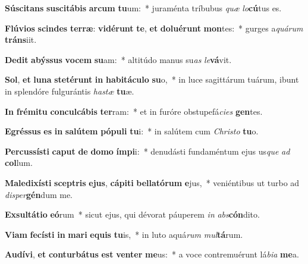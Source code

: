 \item \textbf{Sú}\textbf{sci}\textbf{tans} \textbf{su}\textbf{sci}\textbf{tá}\textbf{bis} \textbf{ar}\textbf{cum} \textbf{tu}um:~* juraménta tríbubus \textit{quæ} \textit{lo}\textbf{cú}tus es.
\item \textbf{Flú}\textbf{vi}\textbf{os} \textbf{scin}\textbf{des} \textbf{ter}\textbf{ræ}: \textbf{vi}\textbf{dé}\textbf{runt} \textbf{te}, \textbf{et} \textbf{do}\textbf{lu}\textbf{é}\textbf{runt} \textbf{mon}tes:~* gurges a\textit{quá}\textit{rum} \textbf{tráns}iit.
\item \textbf{De}\textbf{dit} \textbf{a}\textbf{býs}\textbf{sus} \textbf{vo}\textbf{cem} \textbf{su}am:~* altitúdo manus su\textit{as} \textit{le}\textbf{vá}vit.
\item \textbf{Sol}, \textbf{et} \textbf{lu}\textbf{na} \textbf{ste}\textbf{té}\textbf{runt} \textbf{in} \textbf{ha}\textbf{bi}\textbf{tá}\textbf{cu}\textbf{lo} \textbf{su}o,~* in luce sagittárum tuárum, ibunt in splendóre fulgurántis \textit{has}\textit{tæ} \textbf{tu}æ.
\item \textbf{In} \textbf{fré}\textbf{mi}\textbf{tu} \textbf{con}\textbf{cul}\textbf{cá}\textbf{bis} \textbf{ter}ram:~* et in furóre obstupefá\textit{ci}\textit{es} \textbf{gen}tes.
\item \textbf{E}\textbf{grés}\textbf{sus} \textbf{es} \textbf{in} \textbf{sa}\textbf{lú}\textbf{tem} \textbf{pó}\textbf{pu}\textbf{li} \textbf{tu}i:~* in salútem cum \textit{Chris}\textit{to} \textbf{tu}o.
\item \textbf{Per}\textbf{cus}\textbf{sís}\textbf{ti} \textbf{ca}\textbf{put} \textbf{de} \textbf{do}\textbf{mo} \textbf{ím}\textbf{pi}i:~* denudásti fundaméntum ejus us\textit{que} \textit{ad} \textbf{col}lum.
\item \textbf{Ma}\textbf{le}\textbf{di}\textbf{xís}\textbf{ti} \textbf{scep}\textbf{tris} \textbf{e}\textbf{jus}, \textbf{cá}\textbf{pi}\textbf{ti} \textbf{bel}\textbf{la}\textbf{tó}\textbf{rum} \textbf{e}jus,~* veniéntibus ut turbo ad \textit{di}\textit{sper}\textbf{gén}dum me.
\item \textbf{Ex}\textbf{sul}\textbf{tá}\textbf{ti}\textbf{o} \textbf{e}\textbf{ó}rum~* sicut ejus, qui dévorat páuperem \textit{in} \textit{abs}\textbf{cón}dito.
\item \textbf{Vi}\textbf{am} \textbf{fe}\textbf{cís}\textbf{ti} \textbf{in} \textbf{ma}\textbf{ri} \textbf{e}\textbf{quis} \textbf{tu}is,~* in luto aquá\textit{rum} \textit{mul}\textbf{tá}rum.
\item \textbf{Au}\textbf{dí}\textbf{vi}, \textbf{et} \textbf{con}\textbf{tur}\textbf{bá}\textbf{tus} \textbf{est} \textbf{ven}\textbf{ter} \textbf{me}us:~* a voce contremuérunt lá\textit{bi}\textit{a} \textbf{me}a.

